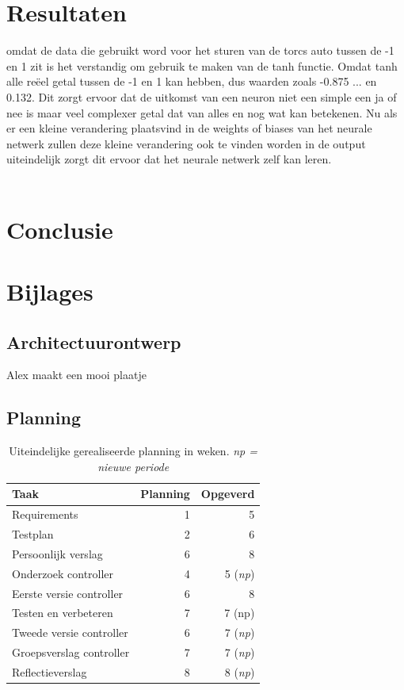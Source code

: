 \documentclass{article}
\begin{document}
\section{Resultaten}
omdat de data die gebruikt word voor het sturen van de torcs auto tussen de -1 en 1 zit is het verstandig om gebruik te maken van de tanh functie. Omdat tanh alle reëel getal tussen de -1 en 1 kan hebben, dus waarden zoals -0.875 ... en 0.132. Dit zorgt ervoor dat de uitkomst van een neuron niet een simple een ja of nee is maar veel complexer getal dat van alles en nog wat kan betekenen. Nu als er een kleine verandering plaatsvind in de weights of biases van het neurale netwerk zullen deze kleine verandering ook te vinden worden in de output uiteindelijk zorgt dit ervoor dat het neurale netwerk zelf kan leren.\\\\
\section{Conclusie}

\pagebreak
\section{Bijlages}
\subsection{Architectuurontwerp}
Alex maakt een mooi plaatje


\pagebreak
\subsection{Planning}
\label{uiteind-plan}
\begin{table}[h!]
\begin{tabular}{lrr}
 \textbf{Taak} & \textbf{Planning} & \textbf{Opgeverd} \\ \hline
 Requirements & 1 & 5 \\
 Testplan & 2 & 6 \\
 Persoonlijk verslag & 6 & 8 \\
 Onderzoek controller & 4 & 5 (\textit{np}) \\
 Eerste versie controller & 6 & 8 \\
 Testen en verbeteren & 7 & 7 (np) \\
 Tweede versie controller & 6 & 7 (\textit{np}) \\
 Groepsverslag controller & 7 & 7 (\textit{np}) \\
 Reflectieverslag & 8 & 8 (\textit{np})  \\
\end{tabular}
\caption{Uiteindelijke gerealiseerde planning in weken. \textit{np = nieuwe periode}}
\end{table}
\newpage


%

\end{document}

